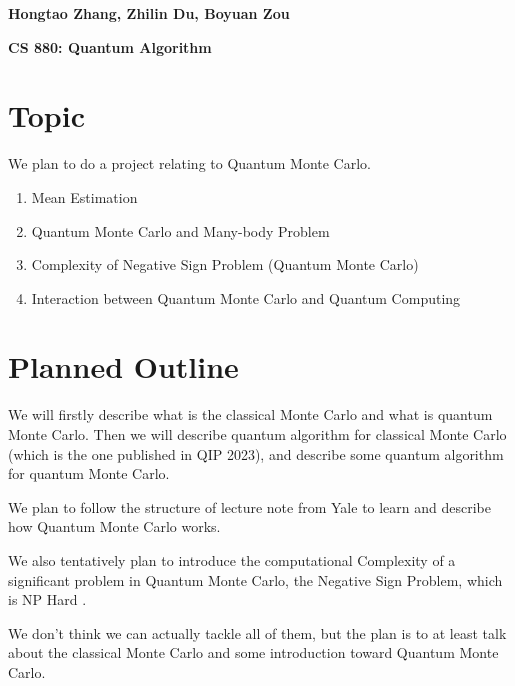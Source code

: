 \documentclass{article}%
\begin{document}
\begin{flushright}
    \textbf{Hongtao Zhang, Zhilin Du, Boyuan Zou \\}
\end{flushright}

\begin{center}
    \textbf{CS 880: Quantum Algorithm} \\
\end{center}

\section*{Topic}

We plan to do a project relating to Quantum Monte Carlo.

\begin{enumerate}
    \item Mean Estimation \cite{kothari2023mean, hamoudi2021quantum, montanaro2015quantum, HEINRICH20021}
    \item Quantum Monte Carlo and Many-body Problem \cite{ceperley1986quantum, boulder2003lecture}
    \item Complexity of Negative Sign Problem (Quantum Monte Carlo) \cite{troyer2005computational}
    \item Interaction between Quantum Monte Carlo and Quantum Computing \cite{huggins2022unbiasing, zhang2022quantum}
\end{enumerate}

\section*{Planned Outline}

We will firstly describe what is the classical Monte Carlo and what is quantum Monte Carlo.
Then we will describe quantum algorithm for classical Monte Carlo (which is the one published
in QIP 2023), and describe some quantum algorithm for quantum Monte Carlo.

We plan to follow the structure of lecture note from Yale \cite{boulder2003lecture} to learn and describe how Quantum Monte Carlo works.

We also tentatively plan to introduce the computational Complexity of a significant problem in 
Quantum Monte Carlo, the Negative Sign Problem, which is NP Hard \cite{troyer2005computational}.

We don't think we can actually tackle all of them, but the plan is to at least talk about 
the classical Monte Carlo and some introduction toward Quantum Monte Carlo.




\end{document}
